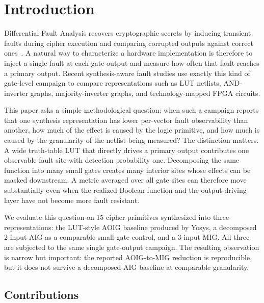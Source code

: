\section{Introduction}
\label{sec:introduction}

Differential Fault Analysis recovers cryptographic secrets by inducing
transient faults during cipher execution and comparing corrupted outputs
against correct ones~\cite{biham1997dfa,bareltal2006fault}. A natural
way to characterize a hardware implementation is therefore to inject a
single fault at each gate output and measure how often that fault reaches
a primary output. Recent synthesis-aware fault studies use exactly this
kind of gate-level campaign to compare representations such as LUT
netlists, AND-inverter graphs, majority-inverter graphs, and
technology-mapped FPGA circuits.

This paper asks a simple methodological question: when such a campaign
reports that one synthesis representation has lower per-vector fault
observability than another, how much of the effect is caused by the
logic primitive, and how much is caused by the granularity of the
netlist being measured? The distinction matters. A wide truth-table LUT
that directly drives a primary output contributes one observable fault
site with detection probability one. Decomposing the same function into
many small gates creates many interior sites whose effects can be masked
downstream. A metric averaged over all gate sites can therefore move
substantially even when the realized Boolean function and the
output-driving layer have not become more fault resistant.

We evaluate this question on 15 cipher primitives synthesized into three
representations: the LUT-style AOIG baseline produced by Yosys, a
decomposed 2-input AIG as a comparable small-gate control, and a
3-input MIG. All three are subjected to the same single gate-output
\bitflip{} campaign. The resulting observation is narrow but important:
the reported AOIG-to-MIG \AvgDP{} reduction is reproducible, but it
does not survive a decomposed-AIG baseline at comparable granularity.

\subsection*{Contributions}

